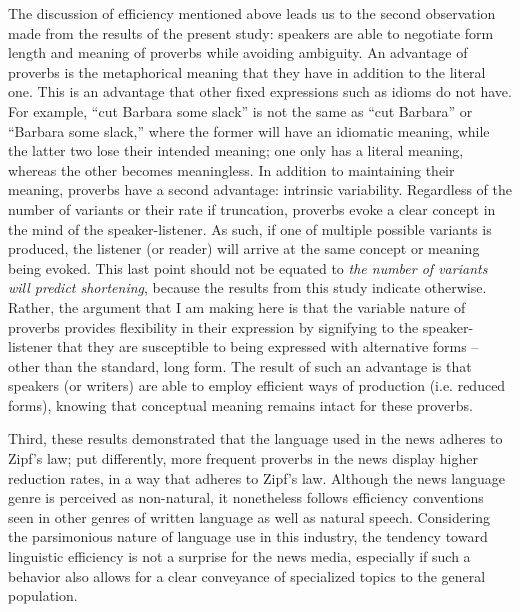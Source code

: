 \documentclass[output=paper,colorlinks,citecolor=brown,draftmode]{langscibook}
\begin{document}
The discussion of efficiency mentioned above leads us to the second observation made from the results of the present study: speakers are able to negotiate form length and meaning of proverbs while avoiding ambiguity. An advantage of proverbs is the metaphorical meaning that they have in addition to the literal one. This is an advantage that other fixed expressions such as idioms do not have. For example, ``cut Barbara some slack'' is not the same as ``cut Barbara'' or ``Barbara some slack,'' where the former will have an idiomatic meaning, while the latter two lose their intended meaning; one only has a literal meaning, whereas the other becomes meaningless. In addition to maintaining their meaning, proverbs have a second advantage: intrinsic variability. Regardless of the number of variants or their rate if truncation, proverbs evoke a clear concept in the mind of the speaker-listener. As such, if one of multiple possible variants is produced, the listener (or reader) will arrive at the same concept or meaning being evoked. This last point should not be equated to \emph{the number of variants will predict shortening}, because the results from this study indicate otherwise. Rather, the argument that I am making here is that the variable nature of proverbs provides flexibility in their expression by signifying to the speaker-listener that they are susceptible to being expressed with alternative forms -- other than the standard, long form. The result of such an advantage is that speakers (or writers) are able to employ efficient ways of production (i.e. reduced forms), knowing that conceptual meaning remains intact for these proverbs.

Third, these results demonstrated that the language used in the news adheres to Zipf's law; put differently, more frequent proverbs in the news display higher reduction rates, in a way that adheres to Zipf's law. Although the news language genre is perceived as non-natural, it nonetheless follows efficiency conventions seen in other genres of written language as well as natural speech. Considering the parsimonious nature of language use in this industry, the tendency toward linguistic efficiency is not a surprise for the news media, especially if such a behavior also allows for a clear conveyance of specialized topics to the general population.
\end{document}
